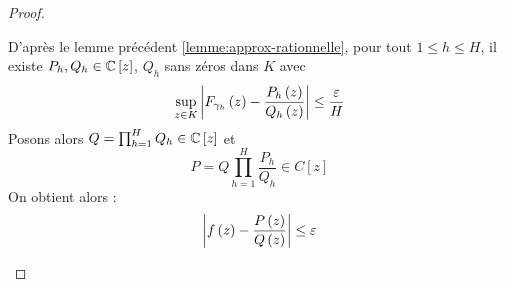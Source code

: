 \documentclass{cours}
\begin{document}
\begin{proof}
\begin{itemize}
        D'après le lemme précédent \ref{lemme:approx-rationnelle}, pour tout $1 \leq h \leq H$, il existe $P_{h}, Q_{h} \in \mathbb{C}\left[z\right]$, $Q_{h}$ sans zéros dans $K$ avec
        \begin{equation*}
            \sup_{z \in K}\left|F_{\gamma_{h}}\left(z\right) - \frac{P_{h}\left(z\right)}{Q_{h}\left(z\right)}\right| \leq \frac{\varepsilon}{H}
        \end{equation*}
        Posons alors $Q = \prod_{h = 1}^{H}Q_{h} \in \mathbb{C}\left[z\right]$ et 
        \begin{equation*}
            P = Q\prod_{h = 1}^{H}\frac{P_{h}}{Q_{h}} \in C\left[z\right]
        \end{equation*}
        On obtient alors : 
        \begin{equation*}
            \left|f\left(z\right) - \frac{P\left(z\right)}{Q\left(z\right)}\right| \leq \varepsilon
        \end{equation*}
    \end{itemize}
\end{proof}
\end{document}
